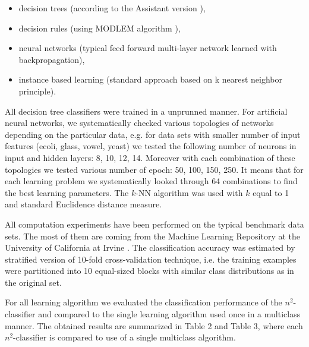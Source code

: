 \documentclass{article}
\begin{document}
\begin{itemize}
\item  decision trees (according to the Assistant version \cite{Cestnik}),

\item  decision rules (using MODLEM algorithm \cite{modlem}),

\item  neural networks (typical feed forward multi-layer network learned
with backpropagation),

\item  instance based learning (standard approach based on k nearest
neighbor principle).
\end{itemize}

All decision tree classifiers were trained in a unprunned manner. For
artificial neural networks, we systematically checked various topologies of
networks depending on the particular data, e.g. for data sets with smaller
number of input features (ecoli, glass, vowel, yeast) we tested the
following number of neurons in input and hidden layers: 8, 10, 12, 14.
Moreover with each combination of these topologies we tested various number
of epoch: 50, 100, 150, 250. It means that for each learning problem we
systematically looked through 64 combinations to find the best learning
parameters. The $k$-NN algorithm was used with $k$ equal to 1 and standard
Euclidence distance measure.

All computation experiments have been performed on the typical benchmark
data sets. The most of them are coming from the Machine Learning Repository
at the University of California at Irvine \cite{Murphy}. The classification
accuracy was estimated by stratified version of 10-fold cross-validation
technique, i.e. the training examples were partitioned into 10 equal-sized
blocks with similar class distributions as in the original set.

For all learning algorithm we evaluated the classification performance of
the $n^2$-classifier and compared to the single learning algorithm used once
in a multiclass manner. The obtained results are summarized in Table 2 and
Table 3, where each $n^2$-classifier is compared to use of a single
multiclass algorithm.
\end{document}
